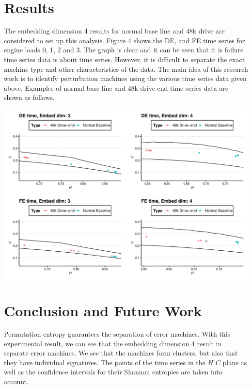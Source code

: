 \documentclass[a0,portrait]{a0poster}
\begin{document}
\begin{mdframed}[style=MyFrame]
\begin{multicols}{2}
\section{Results}\label{section3}
The embedding dimension 4 results for normal base line and 48k drive are considered to set up this analysis. Figure 4 shows the DE, and FE time series for engine loads 0, 1, 2 and 3. The graph is clear and it can be seen that it is failure time series data is about time series. However, it is difficult to separate the exact machine type and other characteristics of the data. The main idea of this research work is to identify perturbation machines using the various time series data given above. 
Examples of normal base line and 48k drive end time series data are shown as follows.
%
\vspace{1cm}
\begin{minipage}{\columnwidth}
    \includegraphics[width=0.9\columnwidth]{confidence_interval.pdf}
\end{minipage}
\vspace{1cm} %

\section{Conclusion and Future Work}

Permutation entropy guarantees the separation of error machines. With this experimental result, we can see that the embedding dimension 4 result in separate error machines. We see that the machines form clusters, but also that they have individual signatures. The points of the time series in the $H$ \times $C$ plane as well as the confidence intervals for their Shannon entropies are taken into account.


\end{multicols}
\end{mdframed}
\end{document}
